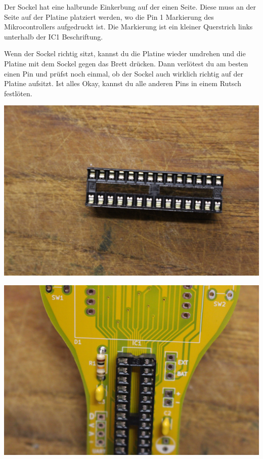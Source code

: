 \documentclass{article}
\begin{document}
Der Sockel hat eine halbrunde Einkerbung auf der einen Seite. Diese muss an der Seite auf der Platine platziert werden, wo die Pin 1 Markierung des Mikrocontrollers aufgedruckt ist. Die Markierung ist ein kleiner Querstrich links unterhalb der IC1 Beschriftung.

Wenn der Sockel richtig sitzt, kannst du die Platine wieder umdrehen und die Platine mit dem Sockel gegen das Brett drücken. Dann verlötest du am besten einen Pin und prüfst noch einmal, ob der Sockel auch wirklich richtig auf der Platine aufsitzt. Ist alles Okay, kannst du alle anderen Pins in einem Rutsch festlöten.

\vspace{1cm}

\begin{minipage}[b]{0.5\textwidth}
	\includegraphics[width=\textwidth]{Bilder/IMG_5553.JPG}
\end{minipage}
\begin{minipage}[b]{0.5\textwidth}
	\includegraphics[width=\textwidth]{Bilder/IMG_5554.JPG}
\end{minipage}
\end{document}
